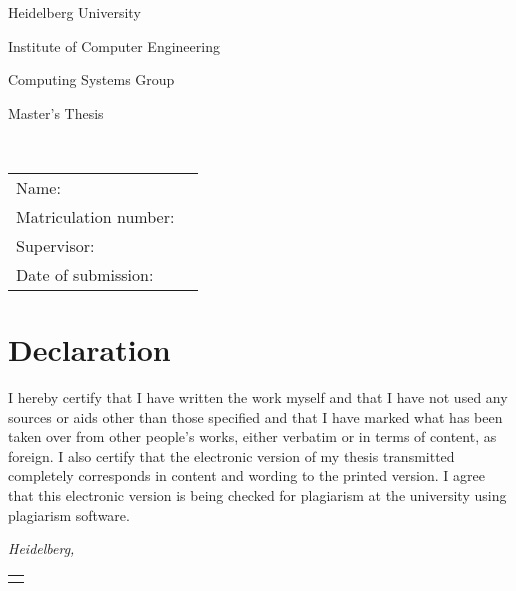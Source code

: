 \begin{titlepage}
\begin{addmargin}[-1cm]{-3cm}
	\begin{center}
		\begingroup
		\Huge
		Heidelberg University \\ \bigskip
		\endgroup

		\begingroup
		\Large
		Institute of Computer Engineering \\ \smallskip
		\endgroup

		\begingroup
		\Large
		Computing Systems Group \\ \smallskip
		\endgroup

		\begingroup
		\Large
		Master's Thesis \\ \bigskip
		\endgroup

		\begingroup
		\Huge
		\myThesisTitle \\ \smallskip
		\endgroup

		\vfill
		\hfill
	\end{center}
	\begingroup
	\large
	\noindent
	\begin{tabular}{ll}
		Name: & \myName \\
		Matriculation number: & \myMatNr \\
		Supervisor: & \myProf \\
		Date of submission: & \myThesisSubmissionDate \\
	\end{tabular}
	\endgroup
\end{addmargin}
\end{titlepage}
\cleardoublepage

\chapter*{Declaration}
\thispagestyle{empty}
I hereby certify that I have written the work myself and that I have not used
any sources or aids other than those specified and that I have marked what
has been taken over from other people's works, either verbatim or in terms of
content, as foreign. I also certify that the electronic version of my thesis
transmitted completely corresponds in content and wording to the printed
version. I agree that this electronic version is being checked for plagiarism
at the university using plagiarism software.
\bigskip

\noindent\textit{Heidelberg, \myThesisSubmissionDate}

\smallskip

\begin{flushright}
	\begin{tabular}{m{5cm}}
		\\ \hline
		\centering\myName \\
	\end{tabular}
\end{flushright}
